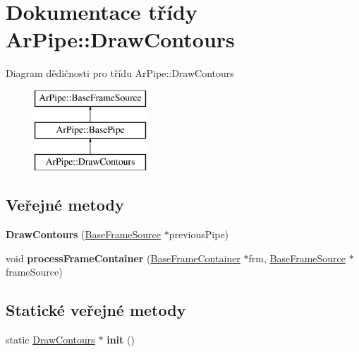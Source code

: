 \hypertarget{class_ar_pipe_1_1_draw_contours}{\section{Dokumentace třídy Ar\-Pipe\-:\-:Draw\-Contours}
\label{db/d85/class_ar_pipe_1_1_draw_contours}
}
Diagram dědičnosti pro třídu Ar\-Pipe\-:\-:Draw\-Contours\begin{figure}[H]
\begin{center}
\leavevmode
\includegraphics[height=3.000000cm]{db/d85/class_ar_pipe_1_1_draw_contours}
\end{center}
\end{figure}
\subsection*{Veřejné metody}
\begin{DoxyCompactItemize}
\item 
\hypertarget{class_ar_pipe_1_1_draw_contours_aa6eaef1d9ee0e61b0b4424f28e5bea37}{{\bfseries Draw\-Contours} (\hyperlink{class_ar_pipe_1_1_base_frame_source}{Base\-Frame\-Source} $\ast$previous\-Pipe)}\label{db/d85/class_ar_pipe_1_1_draw_contours_aa6eaef1d9ee0e61b0b4424f28e5bea37}

\item 
\hypertarget{class_ar_pipe_1_1_draw_contours_abcf5ab4fb2e7e9d7fbecbe84e2fe6f1c}{void {\bfseries process\-Frame\-Container} (\hyperlink{class_ar_pipe_1_1_base_frame_container}{Base\-Frame\-Container} $\ast$frm, \hyperlink{class_ar_pipe_1_1_base_frame_source}{Base\-Frame\-Source} $\ast$frame\-Source)}\label{db/d85/class_ar_pipe_1_1_draw_contours_abcf5ab4fb2e7e9d7fbecbe84e2fe6f1c}

\end{DoxyCompactItemize}
\subsection*{Statické veřejné metody}
\begin{DoxyCompactItemize}
\item 
\hypertarget{class_ar_pipe_1_1_draw_contours_a5ca78f9cbefc9f7bf8dbeb95f53fe870}{static \hyperlink{class_ar_pipe_1_1_draw_contours}{Draw\-Contours} $\ast$ {\bfseries init} ()}\label{db/d85/class_ar_pipe_1_1_draw_contours_a5ca78f9cbefc9f7bf8dbeb95f53fe870}

\end{DoxyCompactItemize}
